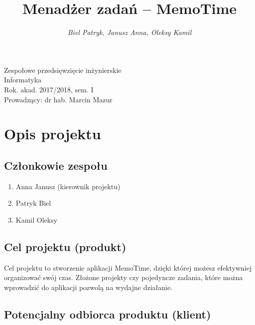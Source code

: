 \documentclass[a4paper]{article}
\title{\bf{Menadżer zadań -- MemoTime}}
\author{{\em Biel Patryk, Janusz Anna, Oleksy Kamil}}
\date{}
\begin{document}
\begin{titlepage}
\maketitle
\thispagestyle{empty}
\bigskip
\begin{center}
Zespołowe przedsięwzięcie inżynierskie\\[2mm]

Informatyka\\[2mm]

Rok. akad. 2017/2018, sem. I\\[2mm]

Prowadzący: dr hab. Marcin Mazur
\end{center}
\end{titlepage}

\tableofcontents
\thispagestyle{empty}

\newpage

\section{Opis projektu}
\label{sec:OpisProjektu}

\subsection{Członkowie zespołu}
\label{subsec:CzlonkowieZespolu}

\begin{enumerate}
\item Anna Janusz (kierownik projektu)
\item Patryk Biel
\item Kamil Oleksy
\end{enumerate}

\subsection{Cel projektu (produkt)}
\label{subsec:CelProjektu}

Cel projektu to stworzenie aplikacji MemoTime, dzięki której możesz efektywniej organizować swój czas. 
Złożone projekty czy pojedyncze zadania, które można wprowadzić do aplikacji pozwolą na wydajne działanie. 

\subsection{Potencjalny odbiorca produktu (klient)}
\label{subsec:PotencjalnyOdbiorcaProduktu}
\end{document}
